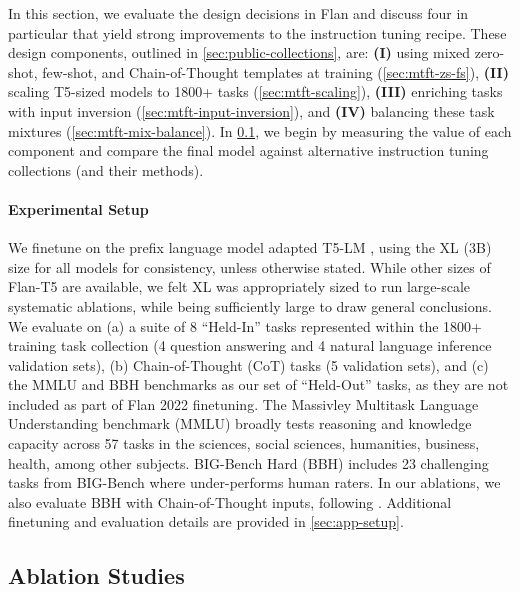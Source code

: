 In this section, we evaluate the design decisions in Flan and discuss four in particular that yield strong improvements to the instruction tuning recipe.
These design components, outlined in \cref{sec:public-collections}, are: \textbf{(I)} using mixed zero-shot, few-shot, and Chain-of-Thought templates at training (\cref{sec:mtft-zs-fs}), \textbf{(II)} scaling T5-sized models to 1800+ tasks (\cref{sec:mtft-scaling}), \textbf{(III)} enriching tasks with input inversion (\cref{sec:mtft-input-inversion}), and \textbf{(IV)} balancing these task mixtures (\cref{sec:mtft-mix-balance}).
In \cref{sec:ablations}, we begin by measuring the value of each component and compare the final model against alternative instruction tuning collections (and their methods).

\vspace{-3mm}
\paragraph{Experimental Setup}
We finetune on the prefix language model adapted T5-LM \citep{lester-etal-2021-power}, using the XL (3B) size for all models for consistency, unless otherwise stated.
While other sizes of Flan-T5 are available, we felt XL was appropriately sized to run large-scale systematic ablations, while being sufficiently large to draw general conclusions.
We evaluate on (a) a suite of 8 ``Held-In'' tasks represented within the 1800+ training task collection (4 question answering and 4 natural language inference validation sets), (b) Chain-of-Thought (CoT) tasks (5 validation sets), and (c) the MMLU \citep{hendrycks2020measuring} and BBH \citep{suzgun2022challenging} benchmarks as our set of ``Held-Out'' tasks, as they are not included as part of Flan 2022 finetuning.
The Massivley Multitask Language Understanding benchmark (MMLU) broadly tests reasoning and knowledge capacity across 57 tasks in the sciences, social sciences, humanities, business, health, among other subjects.
BIG-Bench Hard (BBH) includes 23 challenging tasks from BIG-Bench \citep{bigbench} where \palm{} under-performs human raters.
In our ablations, we also evaluate BBH with Chain-of-Thought inputs, following \citet{chung2022scaling}.
Additional finetuning and evaluation details are provided in \cref{sec:app-setup}.

\subsection{Ablation Studies}
\label{sec:ablations}

